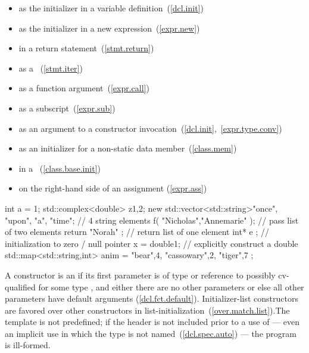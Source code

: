\begin{itemize}
\item as the initializer in a variable definition~(\ref{dcl.init})
\item as the initializer in a new expression~(\ref{expr.new})
\item in a return statement~(\ref{stmt.return})
\item as a ~(\ref{stmt.iter})
\item as a function argument~(\ref{expr.call})
\item as a subscript~(\ref{expr.sub})
\item as an argument to a constructor invocation~(\ref{dcl.init},~\ref{expr.type.conv})
\item as an initializer for a non-static data member~(\ref{class.mem})
\item in a ~(\ref{class.base.init})
\item on the right-hand side of an assignment (\ref{expr.ass})
\end{itemize}

\enterexample
\begin{codeblock}
int a = {1};
std::complex<double> z{1,2};
new std::vector<std::string>{"once", "upon", "a", "time"};  // 4 string elements
f( {"Nicholas","Annemarie"} );  // pass list of two elements
return { "Norah" };             // return list of one element
int* e {};                      // initialization to zero / null pointer
x = double{1};                  // explicitly construct a double 
std::map<std::string,int> anim = { {"bear",4}, {"cassowary",2}, {"tiger",7} };
\end{codeblock}
\exitexample \exitnote

\pnum
A constructor is an  if its first parameter is
of type  or reference to possibly cv-qualified
 for some type , and either there are no other
parameters or else all other parameters have default arguments (\ref{dcl.fct.default}).
\enternote Initializer-list constructors are favored over other constructors in
list-initialization~(\ref{over.match.list}).\exitnote The template
 is not predefined; if the header
 is not included prior to a use of
 --- even an implicit use in which the type is not
named~(\ref{dcl.spec.auto}) --- the program is ill-formed.

